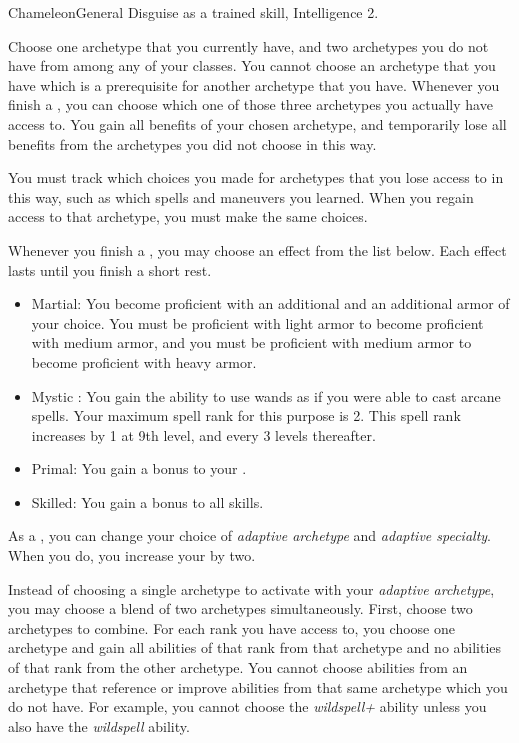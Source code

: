   \begin{feat}{Chameleon}{General}
    \featpre Disguise as a trained skill, Intelligence 2.

     Choose one archetype that you currently have, and two archetypes you do not have from among any of your classes.
    You cannot choose an archetype that you have which is a prerequisite for another archetype that you have.
    Whenever you finish a , you can choose which one of those three archetypes you actually have access to.
    You gain all benefits of your chosen archetype, and temporarily lose all benefits from the archetypes you did not choose in this way.

    You must track which choices you made for archetypes that you lose access to in this way, such as which spells and maneuvers you learned.
    When you regain access to that archetype, you must make the same choices.

     Whenever you finish a , you may choose an effect from the list below.
    Each effect lasts until you finish a short rest.
    \begin{itemize}
      \item Martial: You become proficient with an additional  and an additional armor  of your choice.
        You must be proficient with light armor to become proficient with medium armor, and you must be proficient with medium armor to become proficient with heavy armor.
      \item Mystic \sparkle: You gain the ability to use wands as if you were able to cast arcane spells.
        Your maximum spell rank for this purpose is 2.
        This spell rank increases by 1 at 9th level, and every 3 levels thereafter.
      \item Primal: You gain a  bonus to your .
      \item Skilled: You gain a  bonus to all skills.
    \end{itemize}

     As a , you can change your choice of \textit{adaptive archetype} and \textit{adaptive specialty}.
    When you do, you increase your  by two.

     Instead of choosing a single archetype to activate with your \textit{adaptive archetype}, you may choose a blend of two archetypes simultaneously.
    First, choose two archetypes to combine.
    For each rank you have access to, you choose one archetype and gain all abilities of that rank from that archetype and no abilities of that rank from the other archetype.
    You cannot choose abilities from an archetype that reference or improve abilities from that same archetype which you do not have.
    For example, you cannot choose the \textit{wildspell+} ability unless you also have the \textit{wildspell} ability.


\end{feat}
